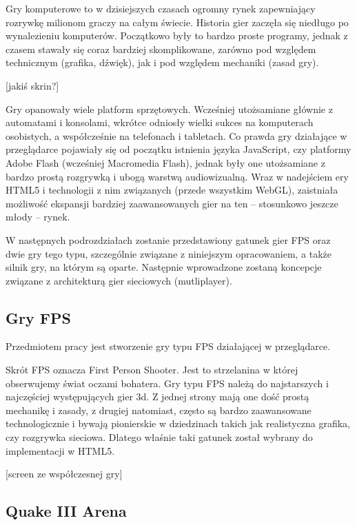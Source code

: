 Gry komputerowe to w dzisiejszych czasach ogromny rynek zapewniający rozrywkę milionom graczy
na całym świecie. Historia gier zaczęła się niedługo po wynalezieniu komputerów. Początkowo
były to bardzo proste programy, jednak z czasem stawały się coraz bardziej skomplikowane,
zarówno pod względem technicznym (grafika, dźwięk), jak i pod względem mechaniki (zasad gry).

[jakiś skrin?]

Gry opanowały wiele platform sprzętowych. Wcześniej utożsamiane głównie z automatami i konsolami,
wkrótce odniosły wielki sukces na komputerach osobistych,
a współcześnie na telefonach i tabletach.
Co prawda gry działające w przeglądarce pojawiały się od początku istnienia języka JavaScript,
czy platformy Adobe Flash (wcześniej Macromedia Flash), jednak były one utożsamiane
z bardzo prostą rozgrywką i ubogą warstwą audiowizualną. Wraz w nadejściem ery HTML5
i technologii z nim związanych (przede wszystkim WebGL), zaistniała możliwość ekspansji
bardziej zaawansowanych gier na ten -- stosunkowo jeszcze młody -- rynek.

W następnych podrozdziałach zostanie przedstawiony gatunek gier FPS oraz dwie gry tego typu,
szczególnie związane z niniejszym opracowaniem, a także silnik gry, na którym są oparte.
Następnie wprowadzone zostaną koncepcje związane z architekturą gier sieciowych (mutliplayer).

\subsection{Gry FPS}

Przedmiotem pracy jest stworzenie gry typu FPS działającej w przeglądarce. 

Skrót FPS oznacza First Person Shooter. Jest to strzelanina w której obserwujemy świat
oczami bohatera. Gry typu FPS należą do najstarszych i najczęściej występujących gier
3d. Z jednej strony mają one dość prostą mechanikę i zasady, z drugiej natomiast, często
są bardzo zaawansowane technologicznie i bywają pionierskie w dziedzinach takich jak
realistyczna grafika, czy rozgrywka sieciowa. Dlatego właśnie taki gatunek został wybrany
do implementacji w HTML5.

[screen ze współczesnej gry]

\subsection{Quake III Arena}
\label{ssec:quake3}

